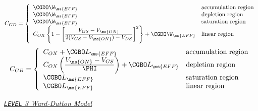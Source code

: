 \begin{equation}
C_{GD} =  \left\{ \begin{array}{ll}
            \CGDO\W_{\ms{EFF}}          & \mbox{accumulation region}\\
            \CGDO\W_{\ms{EFF}}          & \mbox{depletion region}\\
            \CGDO\W_{\ms{EFF}}  & \mbox{saturation region}\\
            C_{OX} \left\{ 1 - \left[
              {{\textstyle V_{GS} - V_{\ms{ON}}} \over
               {\textstyle 2(V_{GS}-V_{\ms{ON}}) - V_{DS}}} \right]^2\right\}
              + \CGDO\W_{\ms{EFF}}  & \mbox{linear region}
            \end{array}
            \right. %
\end{equation}
\begin{equation}
C_{GB} =  \left\{ \begin{array}{ll}
            C_{OX} + \CGBO L_{\ms{EFF}}        & \mbox{accumulation region}\\
            C_{OX} \left({{\textstyle V_{\ms{ON}}-V_{GS}}\over {\textstyle\PHI}}
                   \right) + \CGBO L_{\ms{EFF}} & \mbox{depletion region}\\
            \CGBO L_{\ms{EFF}} & \mbox{saturation region}\\
            \CGBO L_{\ms{EFF}} & \mbox{linear region}
            \end{array}
            \right.%
\end{equation}
\vshift

\noindent\underline{\sl \large {\tt LEVEL} 3 Ward-Dutton Model}\\[0.1in]
  
   

